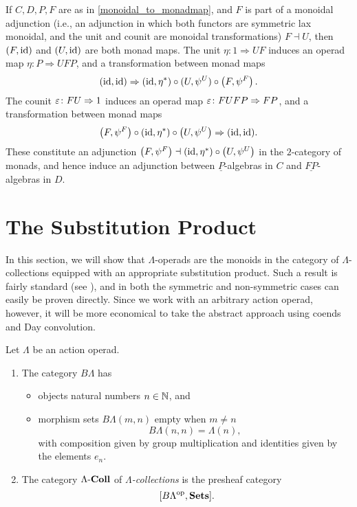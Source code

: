 \begin{cor}\label{monoidaladj_cor}
If $C, D, P, F$ are as in \cref{monoidal_to_monadmap}, and $F$ is part of a monoidal adjunction (i.e., an adjunction in which both functors are symmetric lax monoidal, and the unit and counit are monoidal transformations) $F \dashv U$, then $(F, \textrm{id})$ and $(U, \textrm{id})$ are both monad maps. The unit $\eta \colon 1 \Rightarrow UF$ induces an operad map $\eta \colon P \Rightarrow UFP$, and a transformation between monad maps
  \[
    (\textrm{id}, \textrm{id}) \Rightarrow (\textrm{id}, \eta^*) \circ (U, \psi^U) \circ \left(F, \psi^F\right).
  \]
The counit $\varepsilon \colon FU \Rightarrow 1$ induces an operad map $\varepsilon \colon FUFP \Rightarrow FP$, and a transformation between monad maps
  \[
    \left(F, \psi^F\right) \circ (\textrm{id}, \eta^*) \circ \left(U,\psi^U\right) \Rightarrow (\textrm{id}, \textrm{id}).
  \]
These constitute an adjunction $\left(F,\psi^F\right) \dashv (\textrm{id}, \eta^*) \circ \left(U, \psi^U\right)$ in the $2$-category of monads, and hence induce an adjunction between $\underline{P}$-algebras in $C$ and $\underline{FP}$-algebras in $D$.
\end{cor}

\section{The Substitution Product}\label{sec:sub}

In this section, we will show that $\Lambda$-operads are the monoids in the category of $\Lambda$-collections equipped with an appropriate substitution product. 
Such a result is fairly standard (see \cite[Section 1.8]{mss-op}), and in both the symmetric and non-symmetric cases can easily be proven directly. 
Since we work with an arbitrary action operad, however, it will be more economical to take the abstract approach using coends and Day convolution.

\begin{Defi}\label{Defi:BLambda}
Let $\Lambda$ be an action operad.
\begin{enumerate}
\item The category $B\Lambda$ has 
\begin{itemize}
\item objects natural numbers $n \in \mathbb{N}$, and
\item morphism sets $B\Lambda(m,n)$ empty when $m\neq n$
\[
B\Lambda(n,n) = \Lambda(n),
\]
with composition given by group multiplication and identities given by the elements $e_n$.
\end{itemize}
\item The category $\Lambda\mathbf{\mbox{-}Coll}$ of \emph{$\Lambda$-collections} is the presheaf category
  \[
[B\Lambda^{\textrm{op}}, \mathbf{Sets}].
  \]
\end{enumerate}
\end{Defi}

